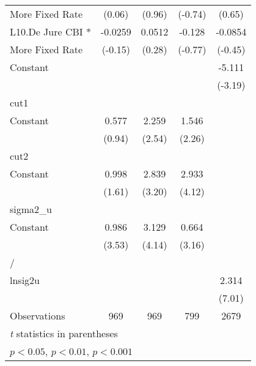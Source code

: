{\begin{tabular}{l*{4}{c}}
More Fixed Rate     &      (0.06)         &      (0.96)         &     (-0.74)         &      (0.65)         \\
[1em]
L10.De Jure CBI *   &     -0.0259         &      0.0512         &      -0.128         &     -0.0854         \\
More Fixed Rate     &     (-0.15)         &      (0.28)         &     (-0.77)         &     (-0.45)         \\
[1em]
Constant            &                     &                     &                     &      -5.111\sym{**} \\
                    &                     &                     &                     &     (-3.19)         \\
\hline
cut1                &                     &                     &                     &                     \\
Constant            &       0.577         &       2.259\sym{*}  &       1.546\sym{*}  &                     \\
                    &      (0.94)         &      (2.54)         &      (2.26)         &                     \\
\hline
cut2                &                     &                     &                     &                     \\
Constant            &       0.998         &       2.839\sym{**} &       2.933\sym{***}&                     \\
                    &      (1.61)         &      (3.20)         &      (4.12)         &                     \\
\hline
sigma2\_u            &                     &                     &                     &                     \\
Constant            &       0.986\sym{***}&       3.129\sym{***}&       0.664\sym{**} &                     \\
                    &      (3.53)         &      (4.14)         &      (3.16)         &                     \\
\hline
/                   &                     &                     &                     &                     \\
lnsig2u             &                     &                     &                     &       2.314\sym{***}\\
                    &                     &                     &                     &      (7.01)         \\
\hline
Observations        &         969         &         969         &         799         &        2679         \\
\hline\hline
\multicolumn{5}{l}{\footnotesize \textit{t} statistics in parentheses}\\
\multicolumn{5}{l}{\footnotesize \sym{*} \(p<0.05\), \sym{**} \(p<0.01\), \sym{***} \(p<0.001\)}\\
\end{tabular}
}
